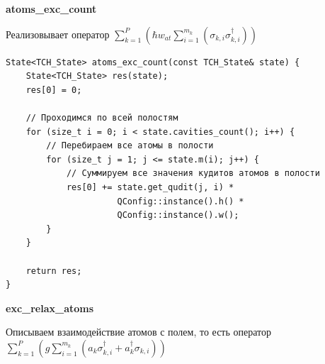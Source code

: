 \documentclass[12pt,fleqn]{article}
\begin{document}
        \begin{center}
            \textbf{atoms\_exc\_count}
        \end{center}

        Реализовывает оператор $\sum \limits_{k = 1}^{P}({\hbar}{w_{at}}{\sum\limits_{i = 1}^{m_k}(\sigma_{k,i}\sigma^{\dagger}_{k,i})})$

\begin{mdframed}[linecolor=black, topline=true, bottomline=true,
leftline=false, rightline=false]
\begin{verbatim}
State<TCH_State> atoms_exc_count(const TCH_State& state) {
    State<TCH_State> res(state);
    res[0] = 0;

    // Проходимся по всей полостям
    for (size_t i = 0; i < state.cavities_count(); i++) {
        // Перебираем все атомы в полости
        for (size_t j = 1; j <= state.m(i); j++) {
            // Суммируем все значения кудитов атомов в полости
            res[0] += state.get_qudit(j, i) * 
                      QConfig::instance().h() * 
                      QConfig::instance().w();
        }
    }

    return res;
}
\end{verbatim}
\end{mdframed}

        \begin{center}
            \textbf{exc\_relax\_atoms}
        \end{center}

        Описываем взаимодействие атомов с полем, то есть оператор $\sum \limits_{k = 1}^{P}({g}\sum\limits_{i=1}^{m_k}({a_k}\sigma^{\dagger}_{k,i} + a^{\dagger}_k\sigma_{k,i}))$
\end{document}
